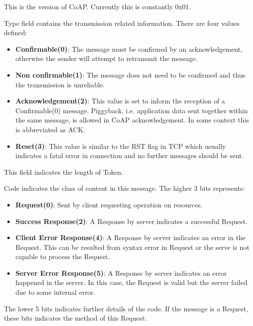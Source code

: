 \begin{description}[style=nextline]
	\item[\textbf{Version}]
	This is the version of CoAP. Currently this is constantly 0x01.
	\item[\textbf{Type}]
	Type field contains the transmission related information. There are four values defined:
	\begin{itemize}
		\item \textbf{Confirmable(0)}: The message must be confirmed by an acknowledgement, otherwise the sender will attempt to retransmit the message.
		\item \textbf{Non confirmable(1)}: The message does not need to be confirmed and thus the transmission is unreliable.
		\item \textbf{Acknowledgement(2)}: This value is set to inform the reception of a Confirmable(0) message. Piggyback, i.e. application data sent together within the same message, is allowed in CoAP acknowledgement. In some context this is abbreviated as ACK.
		\item \textbf{Reset(3)}: This value is similar to the RST flag in TCP which usually indicates a fatal error in connection and no further messages should be sent.
	\end{itemize}
	\item[\textbf{Token Length}]
	This field indicates the length of Token.
	\item[\textbf{Code}]
	Code indicates the class of content in this message. The higher 3 bits represents:
	\begin{itemize}
		\item \textbf{Request(0)}: Sent by client requesting operation on resources.
		\item \textbf{Success Response(2)}: A Response by server indicates a successful Request.
		\item \textbf{Client Error Response(4)}: A Response by server indicates an error in the Request. This can be resulted from syntax error in Request or the serve is not capable to process the Request.
		\item \textbf{Server Error Response(5)}: A Response by server indicates an error happened in the server. In this case, the Request is valid but the server failed due to some internal error.
	\end{itemize}
	The lower 5 bits indicates further details of the code.
	If the message is a Request, these bits indicates the method of this Request:
	\begin{description}[style=nextline]

\end{description}
\end{description}
